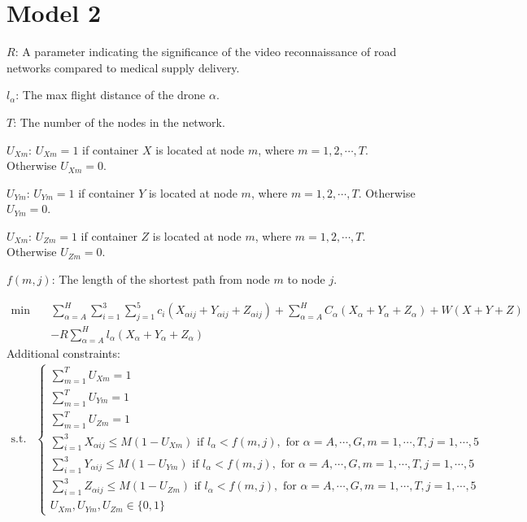 \documentclass{mcmthesis}
\begin{document}
\section{Model 2}

\noindent $R$: A parameter indicating the significance of the video reconnaissance of road networks compared to medical supply delivery. 

\noindent $l_\alpha$: The max flight distance of the drone $\alpha$.

\noindent $T$: The number of the nodes in the network.

\noindent $U_{Xm}$: $U_{Xm}=1$ if container $X$ is located at node $m$, where $m=1,2,\cdots,T$. Otherwise $U_{Xm}=0$.

\noindent $U_{Ym}$: $U_{Ym}=1$ if container $Y$ is located at node $m$, where $m=1,2,\cdots,T$. Otherwise $U_{Ym}=0$.

\noindent $U_{Xm}$: $U_{Zm}=1$ if container $Z$ is located at node $m$, where $m=1,2,\cdots,T$. Otherwise $U_{Zm}=0$.

\noindent $f(m,j)$: The length of the shortest path from node $m$ to node $j$.

\[
\begin{aligned}
\min\quad&\sum_{\alpha=A}^{H}\sum_{i=1}^{3}\sum_{j=1}^{5}c_{i}\left(X_{\alpha ij}+Y_{\alpha ij}+Z_{\alpha ij}\right)
+\sum_{\alpha=A}^{H}C_{{\alpha}}\left(X_{\alpha}+Y_{\alpha }+Z_{\alpha }\right)+W(X+Y+Z)\\
&-R\sum_{\alpha=A}^{H}l_\alpha (X_\alpha+Y_\alpha+Z_\alpha)
\end{aligned}
\]
Additional constraints:
\[
\begin{aligned}
\text{s.t.}&
\left\{
\begin{array}{lr}
\sum\limits_{m=1}^{T}U_{Xm}=1\\
\sum\limits_{m=1}^{T}U_{Ym}=1\\
\sum\limits_{m=1}^{T}U_{Zm}=1\\
\sum\limits_{i=1}^3X_{\alpha ij}\le M(1-U_{Xm})\text{ if }l_{\alpha}< f(m,j)  ,\text{ for }\alpha=A,\cdots,G,m=1,\cdots,T,j=1,\cdots,5\\
\sum\limits_{i=1}^3Y_{\alpha ij}\le M(1-U_{Ym})\text{ if }l_{\alpha}< f(m,j)  ,\text{ for }\alpha=A,\cdots,G,m=1,\cdots,T,j=1,\cdots,5\\
\sum\limits_{i=1}^3Z_{\alpha ij}\le M(1-U_{Zm})\text{ if }l_{\alpha}< f(m,j)  ,\text{ for }\alpha=A,\cdots,G,m=1,\cdots,T,j=1,\cdots,5\\
U_{Xm},U_{Ym},U_{Zm} \in \{0,1\}
\end{array}
\right.
\end{aligned}
\]
\end{document}
